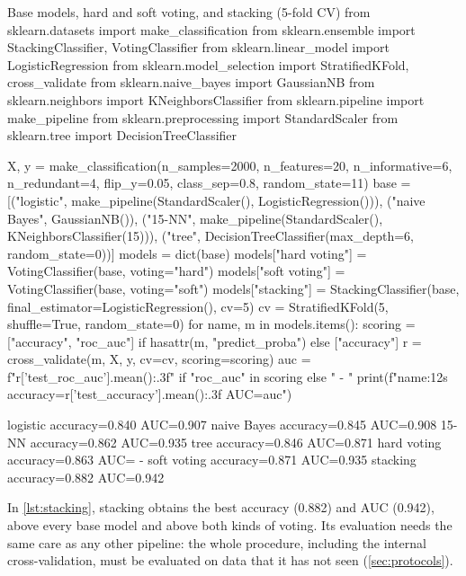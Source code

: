 \begin{pylisting}[label={lst:stacking}]{Base models, hard and soft voting, and stacking (5-fold CV)}
from sklearn.datasets import make_classification
from sklearn.ensemble import StackingClassifier, VotingClassifier
from sklearn.linear_model import LogisticRegression
from sklearn.model_selection import StratifiedKFold, cross_validate
from sklearn.naive_bayes import GaussianNB
from sklearn.neighbors import KNeighborsClassifier
from sklearn.pipeline import make_pipeline
from sklearn.preprocessing import StandardScaler
from sklearn.tree import DecisionTreeClassifier

X, y = make_classification(n_samples=2000, n_features=20, n_informative=6, n_redundant=4,
                           flip_y=0.05, class_sep=0.8, random_state=11)
base = [("logistic", make_pipeline(StandardScaler(), LogisticRegression())),
        ("naive Bayes", GaussianNB()),
        ("15-NN", make_pipeline(StandardScaler(), KNeighborsClassifier(15))),
        ("tree", DecisionTreeClassifier(max_depth=6, random_state=0))]
models = dict(base)
models["hard voting"] = VotingClassifier(base, voting="hard")
models["soft voting"] = VotingClassifier(base, voting="soft")
models["stacking"] = StackingClassifier(base, final_estimator=LogisticRegression(), cv=5)
cv = StratifiedKFold(5, shuffle=True, random_state=0)
for name, m in models.items():
    scoring = ["accuracy", "roc_auc"] if hasattr(m, "predict_proba") else ["accuracy"]
    r = cross_validate(m, X, y, cv=cv, scoring=scoring)
    auc = f"{r['test_roc_auc'].mean():.3f}" if "roc_auc" in scoring else "  -  "
    print(f"{name:12s} accuracy={r['test_accuracy'].mean():.3f}  AUC={auc}")
\end{pylisting}
\begin{pyoutput}
logistic     accuracy=0.840  AUC=0.907
naive Bayes  accuracy=0.845  AUC=0.908
15-NN        accuracy=0.862  AUC=0.935
tree         accuracy=0.846  AUC=0.871
hard voting  accuracy=0.863  AUC=  -  
soft voting  accuracy=0.871  AUC=0.935
stacking     accuracy=0.882  AUC=0.942
\end{pyoutput}

In \cref{lst:stacking}, stacking obtains the best accuracy (0.882) and AUC (0.942), above every
base model and above both kinds of voting. Its evaluation needs the same care as any other
pipeline: the whole procedure, including the internal cross-validation, must be evaluated on
data that it has not seen (\cref{sec:protocols}).

